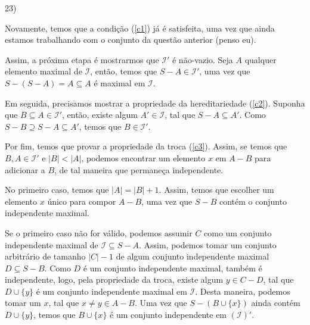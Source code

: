 \documentclass[]{article}
\begin{document}
\vspace{1cm}

23) 

Novamente, temos que a condição (\ref{c1}) já é satisfeita, uma vez que ainda estamos trabalhando com o conjunto da questão anterior (penso eu).

Assim, a próxima etapa é mostrarmos que $\mathcal I'$ é não-vazio. Seja $A$ qualquer elemento maximal de $\mathcal I$, então, temos que $S - A \in \mathcal I'$, uma vez que $S - (S - A) = A \subseteq A$ é maximal em $\mathcal I$.

Em seguida, precisamos mostrar a propriedade da hereditariedade (\ref{c2}). Suponha que $B \subseteq A \in \mathcal I'$, então, existe algum $A' \in \mathcal I$, tal que $S - A \subseteq A'$. Como $S - B \supseteq S - A \subseteq A'$, temos que $B \in \mathcal I'$.

Por fim, temos que provar a propriedade da troca (\ref{c3}). Assim, se temos que $B, A \in \mathcal I'$ e $|B| < |A|$, podemos encontrar um elemento $x$ em $A - B$ para adicionar a $B$, de tal maneira que permaneça independente.

No primeiro caso, temos que $|A| = |B| + 1$. Assim, temos que escolher um elemento $x$ único para compor $A - B$, uma vez que $S - B$ contém o conjunto independente maximal.

Se o primeiro caso não for válido, podemos assumir $C$ como um conjunto independente maximal de $\mathcal I \subseteq S - A$. Assim, podemos tomar um conjunto arbitrário de tamanho $|C| - 1$ de algum conjunto independente maximal $D \subseteq S - B$. Como $D$ é um conjunto independente maximal, também é independente, logo, pela propriedade da troca, existe algum $y \in C - D$, tal que $D \cup \{y\}$ é um conjunto independente maximal em $\mathcal I$. Desta maneira, podemos tomar um $x$, tal que $x \neq y \in A - B$. Uma vez que $S - (B \cup \{x\})$ ainda contém $D \cup \{y\}$, temos que $B \cup \{x\}$ é um conjunto independente em $(\mathcal I)'$.
\end{document}
